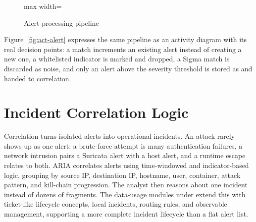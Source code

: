 \begin{figure}[H]
\centering
\begin{adjustbox}{max width=\textwidth}\end{adjustbox}
\caption{Alert processing pipeline}
\end{figure}


Figure~\ref{fig:act-alert} expresses the same pipeline as an activity diagram with its real decision points: a  match increments an existing alert instead of creating a new one, a whitelisted indicator is marked and dropped, a Sigma match is discarded as noise, and only an alert above the severity threshold is stored as  and handed to correlation.


\section{Incident Correlation Logic}

Correlation turns isolated alerts into operational incidents. An attack rarely shows up as one alert: a brute-force attempt is many authentication failures, a network intrusion pairs a Suricata alert with a host alert, and a runtime escape relates to both. ARIA correlates alerts using time-windowed and indicator-based logic, grouping by source IP, destination IP, hostname, user, container, attack pattern, and kill-chain progression. The analyst then reasons about one incident instead of dozens of fragments. The data-usage modules under  extend this with ticket-like lifecycle concepts, local incidents, routing rules, and observable management, supporting a more complete incident lifecycle than a flat alert list.

